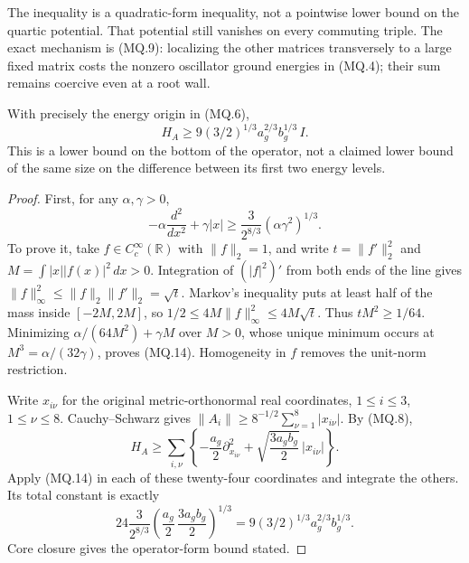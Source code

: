 The inequality is a quadratic-form inequality, not a pointwise
lower bound on the quartic potential. That potential still vanishes
on every commuting triple. The exact mechanism is (MQ.9):
localizing the other matrices transversely to a large fixed matrix
costs the nonzero oscillator ground energies in (MQ.4); their
sum remains coercive even at a root wall.

\begin{proposition}
\label{qh:matrix-bottom}
With precisely the energy origin in (MQ.6),
\[
 H_A\geq 9(3/2)^{1/3}a_g^{2/3}b_g^{1/3}\,I.                    \tag{MQ.13}
\]
This is a lower bound on the bottom of the operator, not a claimed
lower bound of the same size on the difference between its first two
energy levels.
\end{proposition}
\begin{proof}
First, for any $\alpha,\gamma>0$,
\[
 -\alpha\frac{d^2}{dx^2}+\gamma|x|
 \geq \frac3{2^{8/3}}(\alpha\gamma^2)^{1/3}.                 \tag{MQ.14}
\]
To prove it, take $f\in C_c^\infty(\mathbb R)$ with $\|f\|_2=1$,
and write $t=\|f'\|_2^2$ and $M=\int|x||f(x)|^2\,dx>0$.
Integration of $(|f|^2)'$ from both ends of the line gives
$\|f\|_\infty^2\leq\|f\|_2\|f'\|_2=\sqrt t$.
Markov's inequality puts at least half of the mass inside
$[-2M,2M]$, so
$1/2\leq4M\|f\|_\infty^2\leq4M\sqrt t$.
Thus $tM^2\geq1/64$. Minimizing
$\alpha/(64M^2)+\gamma M$ over $M>0$, whose unique minimum
occurs at $M^3=\alpha/(32\gamma)$, proves (MQ.14).
Homogeneity in $f$ removes the unit-norm restriction.

Write $x_{i\nu}$ for the original metric-orthonormal real coordinates,
$1\leq i\leq3$, $1\leq\nu\leq8$. Cauchy--Schwarz gives
$\|A_i\|\geq8^{-1/2}\sum_{\nu=1}^8|x_{i\nu}|$.
By (MQ.8),
\[
 H_A\geq
 \sum_{i,\nu}\left\{
    -\frac{a_g}{2}\partial_{x_{i\nu}}^2
           +\sqrt{\frac{3a_gb_g}{2}}\,|x_{i\nu}|\right\}.
\]
Apply (MQ.14) in each of these twenty-four coordinates and
integrate the others. Its total constant is exactly
\[
 24\frac3{2^{8/3}}\left(\frac{a_g}{2}\,\frac{3a_gb_g}{2}\right)^{1/3}
 =9(3/2)^{1/3}a_g^{2/3}b_g^{1/3}.
\]
Core closure gives the operator-form bound stated.
\end{proof}

